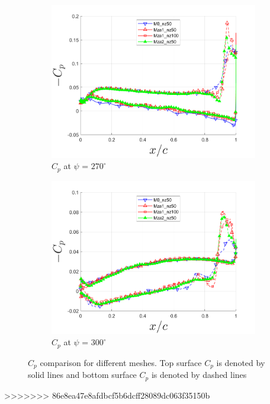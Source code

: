 \begin{figure}[H]
\begin{subfigure}[b]{0.475\textwidth}
		\includegraphics[width=1\textwidth]{figures/zonal_adapt_results/Cp_Re200k/Cp_ph_270.png}
		\caption{ $C_p$ at $\psi$ = $270^\circ$}
		\label{fig:zonal_Cp_Re200k_270}
	\end{subfigure}
	\begin{subfigure}[b]{0.475\textwidth}
		\centering
		\includegraphics[width=1\textwidth]{figures/zonal_adapt_results/Cp_Re200k/Cp_ph_300.png}
		\caption{ $C_p$ at $\psi$ = $300^\circ$}
		\label{fig:zonal_Cp_Re200k_300}
	\end{subfigure}
	\caption{$C_p$ comparison for different meshes. Top surface $C_p$ is denoted by solid lines and bottom surface $C_p$ is denoted by dashed lines}
	\label{fig:zonal_Cp_Re200k_plots}
\end{figure}

>>>>>>> 86e8ea47e8afdbcf5b6dcff28089dc063f35150b
